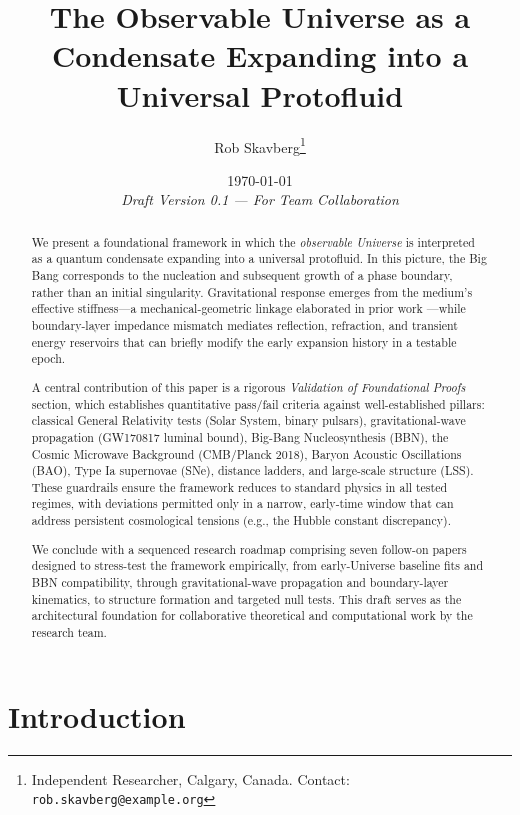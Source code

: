 \documentclass[11pt,a4paper]{article}
\title{\textbf{The Observable Universe as a Condensate Expanding into a Universal Protofluid}}
\author{Rob Skavberg\thanks{Independent Researcher, Calgary, Canada. Contact: \texttt{rob.skavberg@example.org}}}
\date{\today \\ \textit{Draft Version 0.1 --- For Team Collaboration}}
\theoremstyle{definition}
\begin{document}
\maketitle
\doublespacing

\begin{abstract}
We present a foundational framework in which the \emph{observable Universe} is interpreted as a quantum condensate expanding into a universal protofluid. In this picture, the Big Bang corresponds to the nucleation and subsequent growth of a phase boundary, rather than an initial singularity. Gravitational response emerges from the medium's effective stiffness---a mechanical-geometric linkage elaborated in prior work \cite{SkavbergMechG2025,SkavbergMechGR2025,SkavbergPlanckField2025}---while boundary-layer impedance mismatch mediates reflection, refraction, and transient energy reservoirs that can briefly modify the early expansion history in a testable epoch.

A central contribution of this paper is a rigorous \emph{Validation of Foundational Proofs} section, which establishes quantitative pass/fail criteria against well-established pillars: classical General Relativity tests (Solar System, binary pulsars), gravitational-wave propagation (GW170817 luminal bound), Big-Bang Nucleosynthesis (BBN), the Cosmic Microwave Background (CMB/Planck 2018), Baryon Acoustic Oscillations (BAO), Type Ia supernovae (SNe), distance ladders, and large-scale structure (LSS). These guardrails ensure the framework reduces to standard physics in all tested regimes, with deviations permitted only in a narrow, early-time window that can address persistent cosmological tensions (e.g., the Hubble constant discrepancy).

We conclude with a sequenced research roadmap comprising seven follow-on papers designed to stress-test the framework empirically, from early-Universe baseline fits and BBN compatibility, through gravitational-wave propagation and boundary-layer kinematics, to structure formation and targeted null tests. This draft serves as the architectural foundation for collaborative theoretical and computational work by the research team.
\end{abstract}

\tableofcontents
\newpage

\section{Introduction}
\label{sec:intro}
\end{document}
